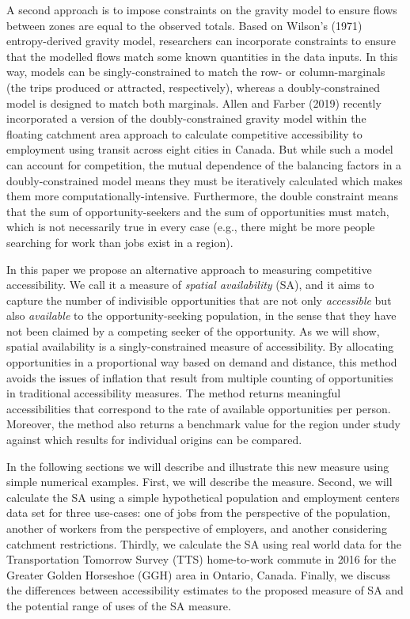 \documentclass[]{elsarticle} %
\begin{document}
A second approach is to impose constraints on the gravity model to
ensure flows between zones are equal to the observed totals. Based on
Wilson's (1971) entropy-derived gravity model, researchers can
incorporate constraints to ensure that the modelled flows match some
known quantities in the data inputs. In this way, models can be
singly-constrained to match the row- or column-marginals (the trips
produced or attracted, respectively), whereas a doubly-constrained model
is designed to match both marginals. Allen and Farber (2019) recently
incorporated a version of the doubly-constrained gravity model within
the floating catchment area approach to calculate competitive
accessibility to employment using transit across eight cities in Canada.
But while such a model can account for competition, the mutual
dependence of the balancing factors in a doubly-constrained model means
they must be iteratively calculated which makes them more
computationally-intensive. Furthermore, the double constraint means that
the sum of opportunity-seekers and the sum of opportunities must match,
which is not necessarily true in every case (e.g., there might be more
people searching for work than jobs exist in a region).

In this paper we propose an alternative approach to measuring
competitive accessibility. We call it a measure of \emph{spatial
availability} (SA), and it aims to capture the number of indivisible
opportunities that are not only \emph{accessible} but also
\emph{available} to the opportunity-seeking population, in the sense
that they have not been claimed by a competing seeker of the
opportunity. As we will show, spatial availability is a
singly-constrained measure of accessibility. By allocating opportunities
in a proportional way based on demand and distance, this method avoids
the issues of inflation that result from multiple counting of
opportunities in traditional accessibility measures. The method returns
meaningful accessibilities that correspond to the rate of available
opportunities per person. Moreover, the method also returns a benchmark
value for the region under study against which results for individual
origins can be compared.

In the following sections we will describe and illustrate this new
measure using simple numerical examples. First, we will describe the
measure. Second, we will calculate the SA using a simple hypothetical
population and employment centers data set for three use-cases: one of
jobs from the perspective of the population, another of workers from the
perspective of employers, and another considering catchment
restrictions. Thirdly, we calculate the SA using real world data for the
Transportation Tomorrow Survey (TTS) home-to-work commute in 2016 for
the Greater Golden Horseshoe (GGH) area in Ontario, Canada. Finally, we
discuss the differences between accessibility estimates to the proposed
measure of SA and the potential range of uses of the SA measure.
\end{document}

